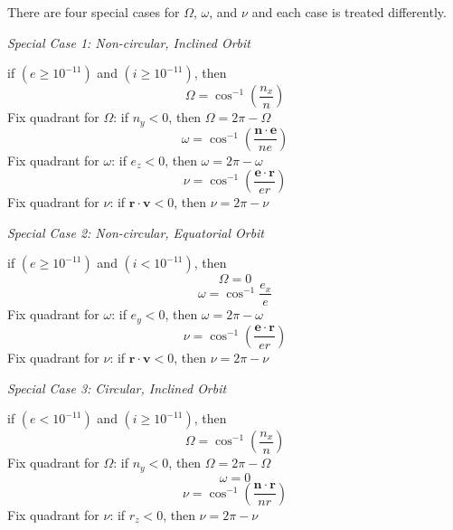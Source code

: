 There are four special cases for $\Omega$, $\omega$, and $\nu$ and
each case is treated differently.

\noindent\textit{Special Case 1:  Non-circular, Inclined Orbit  }

\noindent if $(e \geq 10^{-11})$  and $(i \geq 10^{-11})$, then
%
\begin{equation}
    \Omega = \cos^{-1}\left(\frac{n_x}{n}\right)
\end{equation}
%
Fix quadrant for $\Omega$: if $n_y < 0$, then $\Omega = 2\pi -
\Omega$
%
\begin{equation}
    \omega = \cos^{-1}\left( \frac{\mathbf{n}\cdot\mathbf{e}}{ne}\right)
\end{equation}
%
Fix quadrant for $\omega $:  if $e_z < 0$, then $\omega = 2\pi -
\omega$
%
\begin{equation}
    \nu = \cos^{-1}\left( \frac{\mathbf{e}\cdot\mathbf{r}}{er}\right)
\end{equation}
%
Fix quadrant for $\nu $:  if $\mathbf{r} \cdot \mathbf{v} < 0$, then
$\nu = 2\pi - \nu$

\noindent\textit{Special Case 2:  Non-circular, Equatorial Orbit
}

\noindent if $(e \geq 10^{-11})$  and $(i < 10^{-11})$, then
%
\begin{equation}
    \Omega = 0
\end{equation}
%
\begin{equation}
     \omega = \cos^{-1}{\frac{e_x}{e}}
\end{equation}
%
Fix quadrant for $\omega $: if $e_y < 0$, then $\omega = 2\pi -
\omega$
%
\begin{equation}
    \nu = \cos^{-1}\left( \frac{\mathbf{e}\cdot\mathbf{r}}{er}\right)
\end{equation}
%
Fix quadrant for $\nu $:  if $\mathbf{r} \cdot \mathbf{v} < 0$, then
$\nu = 2\pi - \nu$
%

\noindent\textit{Special Case 3:  Circular, Inclined Orbit  }

\noindent if $(e < 10^{-11})$  and $(i \geq 10^{-11})$, then
%
\begin{equation}
    \Omega = \cos^{-1}\left(\frac{n_x}{n}\right)
\end{equation}
%
Fix quadrant for $\Omega$: if $n_y < 0$, then $\Omega = 2\pi -
\Omega$
\begin{equation}
     \omega = 0
\end{equation}
%
\begin{equation}
    \nu = \cos^{-1}\left( \frac{\mathbf{n}\cdot\mathbf{r}}{nr}\right)
\end{equation}
%
Fix quadrant for $\nu$:  if $r_z < 0$, then $\nu = 2\pi - \nu$

